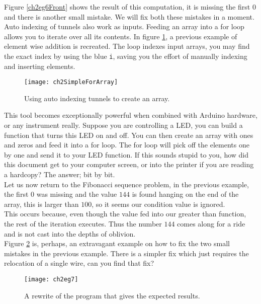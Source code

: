 Figure \ref{ch2eg6Front} shows the result of this computation, it is missing the first $0$ and there is another small mistake. We will fix both these mistakes in a moment.\\

Auto indexing of tunnels also work as inputs. Feeding an array into a for loop allows you to iterate over all its contents. In figure \ref{ch2SimpleForArray}, a previous example of element wise addition is recreated. The loop indexes input arrays, you may find the exact index by using the blue \texttt{i}, saving you the effort of manually indexing and inserting elements.\\
\begin{figure}
	\centering
	\texttt{[image: ch2SimpleForArray]}
	\caption{Using auto indexing tunnels to create an array.}
	\label{ch2SimpleForArray}
\end{figure}

This tool becomes exceptionally powerful when combined with Arduino hardware, or any instrument really. Suppose you are controlling a LED, you can build a function that turns this LED on and off. You can then create an array with ones and zeros and feed it into a for loop. The for loop will pick off the elements one by one and send it to your LED function. If this sounds stupid to you, how did this document get to your computer screen, or into the printer if you are reading a hardcopy? The answer; bit by bit.\\

Let us now return to the Fibonacci sequence problem, in the previous example, the first $0$ was missing and the value $144$ is found hanging on the end of the array, this is larger than $100$, so it seems our condition value is ignored.\\

This occurs because, even though the value fed into our greater than function, the rest of the iteration executes. Thus the number $144$ comes along for a ride and is not cast into the depths of oblivion.\\

Figure \ref{ch2eg7} is, perhaps, an extravagant example on how to fix the two small mistakes in the previous example. There is a simpler fix which just requires the relocation of a single wire, can you find that fix?\\
\begin{figure}
	\centering
	\texttt{[image: ch2eg7]}
	\caption{A rewrite of the program that gives the expected results.}
	\label{ch2eg7}
\end{figure}

